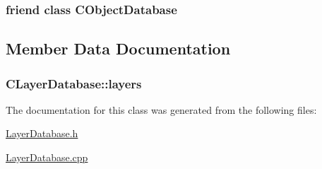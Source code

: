 \subsubsection[{C\+Object\+Database}]{\setlength{\rightskip}{0pt plus 5cm}friend class {\bf C\+Object\+Database}\hspace{0.3cm}{\ttfamily [friend]}}\label{class_c_layer_database_a8451ee9e81bc51a04afb10dc6ee7e07e}


\subsection{Member Data Documentation}
\hypertarget{class_c_layer_database_a7966885ad0f4bf5cedaa8596af46dad7}{}
\subsubsection[{layers}]{ C\+Layer\+Database\+::layers}\label{class_c_layer_database_a7966885ad0f4bf5cedaa8596af46dad7}


The documentation for this class was generated from the following files\+:\begin{DoxyCompactItemize}
\item 
\hyperlink{_layer_database_8h}{Layer\+Database.\+h}\item 
\hyperlink{_layer_database_8cpp}{Layer\+Database.\+cpp}\end{DoxyCompactItemize}
